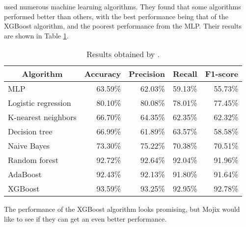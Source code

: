\documentclass{article}
\begin{document}
\citet{ref:Alfian} used numerous machine learning algorithms.
They found that some algorithms performed better than others, with the best performance being that of the XGBoost algorithm, and the poorest performance from the \ac{MLP}.
Their results are shown in Table \ref{tab:alfian_results}.
%
\begin{table}[h!]
\centering
\setlength{\belowcaptionskip}{7pt}
\caption{Results obtained by \citet{ref:Alfian}.}
\label{tab:alfian_results}
\begin{tabular}{@{}lrrrr@{}}
\toprule
\multicolumn{1}{c}{\textbf{Algorithm}} & \multicolumn{1}{c}{\textbf{Accuracy}} & \multicolumn{1}{c}{\textbf{Precision}} & \multicolumn{1}{c}{\textbf{Recall}} & \multicolumn{1}{c}{\textbf{F1-score}} \\ \midrule
\ac{MLP}                                & 63.59\%                           & 62.03\%                                         & 59.13\%                           & 55.73\%                               \\
Logistic regression                    & 80.10\%                               & 80.08\%                                & 78.01\%                             & 77.45\%                               \\
K-nearest neighbors                    & 66.70\%                               & 64.35\%                                & 62.35\%                             & 62.32\%                               \\
Decision tree                          & 66.99\%                               & 61.89\%                                & 63.57\%                             & 58.58\%                               \\
Naive Bayes                            & 73.30\%                               & 75.22\%                                & 70.38\%                             & 70.51\%                               \\
Random forest                          & 92.72\%                               & 92.64\%                                & 92.04\%                             & 91.96\%                               \\
AdaBoost                               & 92.43\%                               & 92.13\%                                & 91.80\%                             & 91.64\%                               \\
XGBoost                                & 93.59\%                               & 93.25\%                                & 92.95\%                             & 92.78\%                               \\ \bottomrule
\end{tabular}
\end{table}
%
The performance of the XGBoost algorithm looks promising, but Mojix would like to see if they can get an even better performance.
\end{document}
